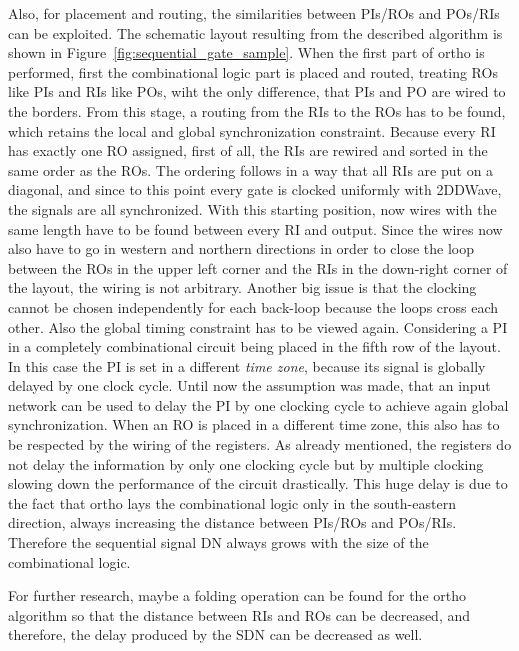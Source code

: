 Also, for placement and routing, the similarities between PIs/ROs and POs/RIs can be exploited. The schematic layout resulting from the described algorithm is shown in Figure~\ref{fig:sequential_gate_sample}. When the first part of ortho is performed, first the combinational logic part is placed and routed, treating ROs like PIs and RIs like POs, wiht the only difference, that PIs and PO are wired to the borders. From this stage, a routing from the RIs to the ROs has to be found, which retains the local and global synchronization constraint. Because every RI has exactly one RO assigned, first of all, the RIs are rewired and sorted in the same order as the ROs. The ordering follows in a way that all RIs are put on a diagonal, and since to this point every gate is clocked uniformly with 2DDWave, the signals are all synchronized. With this starting position, now wires with the same length have to be found between every RI and output. Since the wires now also have to go in western and northern directions in order to close the loop between the ROs in the upper left corner and the RIs in the down-right corner of the layout, the wiring is not arbitrary. Another big issue is that the clocking cannot be chosen independently for each back-loop because the loops cross each other. Also the global timing constraint has to be viewed again. Considering a PI in a completely combinational circuit being placed in the fifth row of the layout. In this case the PI is set in a different \textit{time zone}, because its signal is globally delayed by one clock cycle. Until now the assumption was made, that an input network can be used to delay the PI by one clocking cycle to achieve again global synchronization. When an RO is placed in a different time zone, this also has to be respected by the wiring of the registers. As already mentioned, the registers do not delay the information by only one clocking cycle but by multiple clocking slowing down the performance of the circuit drastically. This huge delay is due to the fact that ortho lays the combinational logic only in the south-eastern direction, always increasing the distance between PIs/ROs and POs/RIs. Therefore the sequential signal DN always grows with the size of the combinational logic.

For further research, maybe a folding operation can be found for the ortho algorithm so that the distance between RIs and ROs can be decreased, and therefore, the delay produced by the SDN can be decreased as well.

